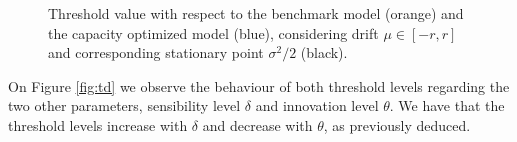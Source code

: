 \begin{figure}[!htb]
	\begin{subfigmatrix}{2}
	\end{subfigmatrix}
	\caption{Threshold value with respect to the benchmark model (orange) and the capacity optimized model (blue), considering drift $\mu \in [-r, r]$ and corresponding stationary point $\sigma^2/2$ (black).}
	\label{fig:mu}
\end{figure}

On Figure \ref{fig:td} we observe the behaviour of both threshold levels regarding the two other parameters, sensibility level $\delta$ and innovation level $\theta$. We have that the threshold levels increase with $\delta$ and decrease with $\theta$, as previously deduced.

